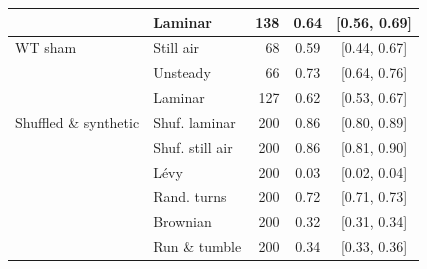 \begin{table}[ht]
\begin{tabular}{llrcc}
 & Laminar & 138 & 0.64 & [0.56, 0.69] \\
\hline
WT sham & Still air & 68 & 0.59 & [0.44, 0.67] \\
 & Unsteady & 66 & 0.73 & [0.64, 0.76] \\
 & Laminar & 127 & 0.62 & [0.53, 0.67] \\
\hline
Shuffled \& synthetic & Shuf. laminar & 200 & 0.86 & [0.80, 0.89] \\
 & Shuf. still air & 200 & 0.86 & [0.81, 0.90] \\
 & L\'evy & 200 & 0.03 & [0.02, 0.04] \\
 & Rand. turns & 200 & 0.72 & [0.71, 0.73] \\
 & Brownian & 200 & 0.32 & [0.31, 0.34] \\
 & Run \& tumble & 200 & 0.34 & [0.33, 0.36] \\
\hline
\end{tabular}
\end{table}
